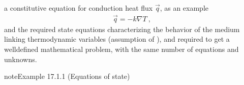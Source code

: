 \documentclass[letterpaper,10pt,english]{jupyterBook}
\begin{document}
\sphinxAtStartPar
a constitutive equation for conduction heat flux \(\vec{q}\), as an example 
\begin{equation*}
\begin{split}\vec{q} = - k \nabla T \ ,\end{split}
\end{equation*}
\sphinxAtStartPar
and the required state equations characterizing the behavior of the medium linking thermodynamic variables (assumption of   ), and required to get a well\sphinxhyphen{}defined mathematical problem, with the same number of equations and unknowns.
\label{ch/fluids/governing-equations:example-0}
\begin{sphinxadmonition}{note}{Example 17.1.1 (Equations of state)}




\end{sphinxadmonition}
\end{document}
